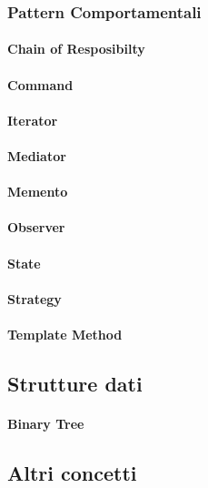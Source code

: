 \documentclass{article}
\begin{document}
        \subsubsection{Pattern Comportamentali}
        
            \paragraph{Chain of Resposibilty}
            \paragraph{Command}
            \paragraph{Iterator}
            \paragraph{Mediator}
            \paragraph{Memento}
            \paragraph{Observer}
            \paragraph{State}
            \paragraph{Strategy}
            \paragraph{Template Method}
                
    \subsection{Strutture dati}
        \paragraph{Binary Tree}
    
    \subsection{Altri concetti}
\end{document}
